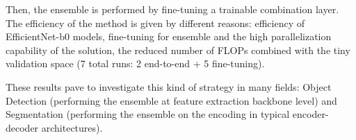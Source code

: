 \documentclass[review]{elsarticle}
\begin{document}
Then, the ensemble is performed by fine-tuning a trainable combination layer. The efficiency of the method is given by different reasons: efficiency of EfficientNet-b0 models, fine-tuning for ensemble and the high parallelization capability of the solution, the reduced number of FLOPs combined with the tiny validation space (7 total runs: 2 end-to-end + 5 fine-tuning).


These results pave to investigate this kind of strategy in many fields: Object Detection (performing the ensemble at feature extraction backbone level) and Segmentation (performing the ensemble on the encoding in typical encoder-decoder architectures).










\end{document}
